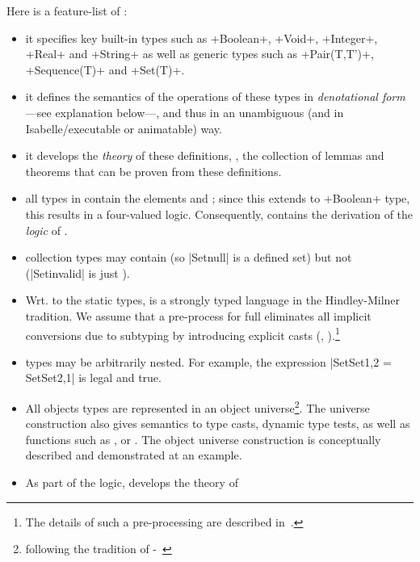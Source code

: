 Here is a feature-list of  \FOCL:
\begin{itemize}
 \item it specifies key built-in types such as \inlineocl+Boolean+,
         \inlineocl+Void+, \inlineocl+Integer+, \inlineocl+Real+ and 
         \inlineocl+String+ as well as generic types such as 
         \inlineocl+Pair(T,T')+, \inlineocl+Sequence(T)+ and \inlineocl+Set(T)+.
 \item it defines the semantics of the operations of these types in 
         \emph{denotational form}---see explanation below---,
         and thus in an unambiguous (and in Isabelle/\HOL executable or 
         animatable) way.
       \item it develops the \emph{theory} of these definitions, \ie, the collection 
         of lemmas and theorems that can be proven from these definitions.
 \item all types in  \FOCL contain the elements  and ;
         since this extends to \inlineocl+Boolean+ type, this results
         in a four-valued logic. Consequently,  \FOCL contains
         the derivation of the \emph{logic} of \OCL.
 \item collection types may contain
          (so \inlineocl|Set{null}| is a defined set) but not
          (\inlineocl|Set{invalid}| is just
         ).
 \item Wrt. to the static types,  \FOCL is a strongly typed language in
         the Hindley-Milner tradition.
         We assume that a pre-process for full \OCL eliminates all implicit
         conversions due to subtyping by introducing explicit casts (\eg,
         ).\footnote{The details of such a 
         pre-processing are  described in~\cite{brucker:interactive:2007}.}
 \item  \FOCL types may be arbitrarily nested. For example,
         the expression
         \inlineocl|Set{Set{1,2}} = Set{Set{2,1}}| is legal and true.
 \item All objects types are represented in an object universe\footnote{following
         the tradition of \HOL-\OCL~\cite{brucker.ea:extensible:2008-b}}.
         The universe construction also gives semantics to type casts, dynamic type
         tests, as well as functions such as ,
         or . The object universe construction is
         conceptually described and demonstrated at an example.
 \item As part of the \OCL logic,  \FOCL develops the theory of

\end{itemize}
